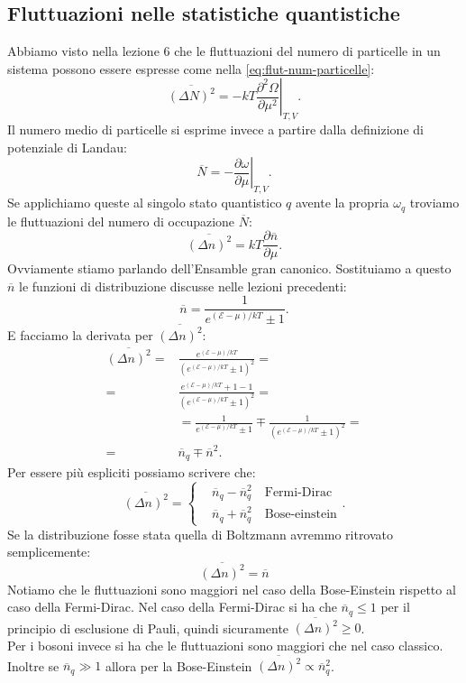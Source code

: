 \subsection{Fluttuazioni nelle statistiche quantistiche}
\label{subsec:Fluttuazioni nelle statistiche quantistiche}
Abbiamo visto nella lezione 6 che le fluttuazioni del numero di particelle in un sistema possono essere espresse come nella \ref{eq:flut-num-particelle}:
\[
	\overline{\left( \Delta N \right)^2} 
	=
	-kT
	\left.\frac{\partial ^2 \Omega }{\partial \mu ^2} \right|_{T,V}
.\] 
Il numero medio di particelle si esprime invece a partire dalla definizione di potenziale di Landau:
\[
	\overline{N}
	=
	- \left.\frac{\partial \omega }{\partial \mu } \right|_{T,V}
.\] 
Se applichiamo queste al singolo stato quantistico $q$ avente la propria $\omega _q$ troviamo le fluttuazioni del numero di occupazione $\overline{N}$:
\[
	\overline{\left( \Delta n \right)^2}
	=
	kT \frac{\partial \overline{n}}{\partial \mu } 
.\] 
Ovviamente stiamo parlando dell'Ensamble gran canonico. Sostituiamo a questo $\overline{n}$ le funzioni di distribuzione discusse nelle lezioni precedenti:
\[
	\overline{n} 
	= 
	\frac{1}{e^{\left( \mathcal{E} - \mu  \right) /kT} \pm 1}
.\] 
E facciamo la derivata per $\overline{\left( \Delta n \right)^2}$:
\[\begin{aligned}
	\overline{\left( \Delta n \right) ^2}
	=&
	\frac{e^{\left( \mathcal{E} -\mu  \right) /kT}}
	{\left( e^{\left( \mathcal{E} -\mu  \right) /kT} \pm 1 \right)^2}=\\
	=&
	\frac{e^{\left( \mathcal{E} -\mu  \right) /kT} +1 - 1}
	{\left( e^{\left( \mathcal{E} -\mu  \right) /kT} \pm 1 \right)^2}=\\
	&=  
	\frac{1}{e^{\left( \mathcal{E} -\mu  \right) /kT} \pm 1 } \mp 
	\frac{1}{\left( e^{\left( \mathcal{E} -\mu  \right) /kT} \pm 1  \right)^2}=\\
	=& 
	\overline{n}_q \mp \overline{n}^2
.\end{aligned}\]
Per essere più espliciti possiamo scrivere che:
\[
	\overline{\left( \Delta n \right)^2} 
	=
	\begin{cases}
		&\overline{n}_q - \overline{n}_q^2 \quad \text{Fermi-Dirac} \\
		&\overline{n}_q + \overline{n}_q^2 \quad \text{Bose-einstein}
	\end{cases}
.\] 
Se la distribuzione fosse stata quella di Boltzmann avremmo ritrovato semplicemente:
\[
	\overline{\left( \Delta n\right)^2} = \overline{n}
\] 
Notiamo che le fluttuazioni sono maggiori nel caso della Bose-Einstein rispetto al caso della Fermi-Dirac. 
Nel caso della Fermi-Dirac si ha che $\overline{n}_q \le 1$ per il principio di esclusione di Pauli, quindi sicuramente $\overline{\left( \Delta n \right)^2} \ge 0$. \\
Per i bosoni invece si ha che le fluttuazioni sono maggiori che nel caso classico. 
Inoltre se $\overline{n}_q \gg 1$ allora per la Bose-Einstein $\overline{\left( \Delta n \right)^2} \propto \overline{n}_q^2$.
